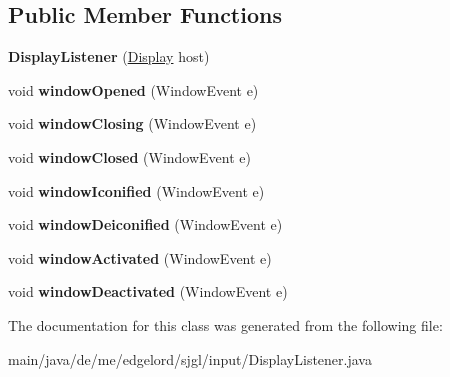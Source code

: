 \subsection*{Public Member Functions}
\begin{DoxyCompactItemize}
\item 
\mbox{\label{classde_1_1me_1_1edgelord_1_1sjgl_1_1input_1_1_display_listener_a43bf6f48ed4a0caca53045429cc764ae}} 
{\bfseries Display\+Listener} (\mbox{\hyperlink{classde_1_1me_1_1edgelord_1_1sjgl_1_1display_1_1_display}{Display}} host)
\item 
\mbox{\label{classde_1_1me_1_1edgelord_1_1sjgl_1_1input_1_1_display_listener_a7604b5b180e18f7899b49418882d89c5}} 
void {\bfseries window\+Opened} (Window\+Event e)
\item 
\mbox{\label{classde_1_1me_1_1edgelord_1_1sjgl_1_1input_1_1_display_listener_a2295d4c13feb976b93269f0d9a901823}} 
void {\bfseries window\+Closing} (Window\+Event e)
\item 
\mbox{\label{classde_1_1me_1_1edgelord_1_1sjgl_1_1input_1_1_display_listener_af09b41a66fb43e0955f639efa3b93a7b}} 
void {\bfseries window\+Closed} (Window\+Event e)
\item 
\mbox{\label{classde_1_1me_1_1edgelord_1_1sjgl_1_1input_1_1_display_listener_a184a8279bd5a25057764757f12c3dc13}} 
void {\bfseries window\+Iconified} (Window\+Event e)
\item 
\mbox{\label{classde_1_1me_1_1edgelord_1_1sjgl_1_1input_1_1_display_listener_a89d505c018596cee8963d7adde8d08a8}} 
void {\bfseries window\+Deiconified} (Window\+Event e)
\item 
\mbox{\label{classde_1_1me_1_1edgelord_1_1sjgl_1_1input_1_1_display_listener_a21d8b9c021ab5d3d09173ad582521bae}} 
void {\bfseries window\+Activated} (Window\+Event e)
\item 
\mbox{\label{classde_1_1me_1_1edgelord_1_1sjgl_1_1input_1_1_display_listener_a60a9874ddca9a2272b6b2175d2116855}} 
void {\bfseries window\+Deactivated} (Window\+Event e)
\end{DoxyCompactItemize}


The documentation for this class was generated from the following file\+:\begin{DoxyCompactItemize}
\item 
main/java/de/me/edgelord/sjgl/input/Display\+Listener.\+java\end{DoxyCompactItemize}
